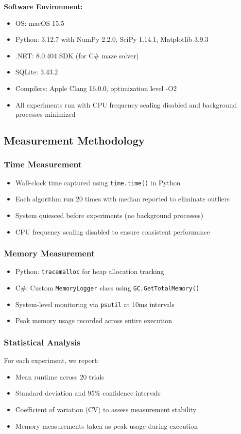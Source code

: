 \documentclass[11pt]{article}
\theoremstyle{definition}
\begin{document}
\textbf{Software Environment:}
\begin{itemize}
\item OS: macOS 15.5
\item Python: 3.12.7 with NumPy 2.2.0, SciPy 1.14.1, Matplotlib 3.9.3
\item .NET: 8.0.404 SDK (for C\# maze solver)
\item SQLite: 3.43.2
\item Compilers: Apple Clang 16.0.0, optimization level -O2
\item All experiments run with CPU frequency scaling disabled and background processes minimized
\end{itemize}

\subsection{Measurement Methodology}

\subsubsection{Time Measurement}
\begin{itemize}
\item Wall-clock time captured using \texttt{time.time()} in Python
\item Each algorithm run 20 times with median reported to eliminate outliers
\item System quiesced before experiments (no background processes)
\item CPU frequency scaling disabled to ensure consistent performance
\end{itemize}

\subsubsection{Memory Measurement}
\begin{itemize}
\item Python: \texttt{tracemalloc} for heap allocation tracking
\item C\#: Custom \texttt{MemoryLogger} class using \texttt{GC.GetTotalMemory()}
\item System-level monitoring via \texttt{psutil} at 10ms intervals
\item Peak memory usage recorded across entire execution
\end{itemize}

\subsubsection{Statistical Analysis}
For each experiment, we report:
\begin{itemize}
\item Mean runtime across 20 trials
\item Standard deviation and 95\% confidence intervals
\item Coefficient of variation (CV) to assess measurement stability
\item Memory measurements taken as peak usage during execution
\end{itemize}
\end{document}
